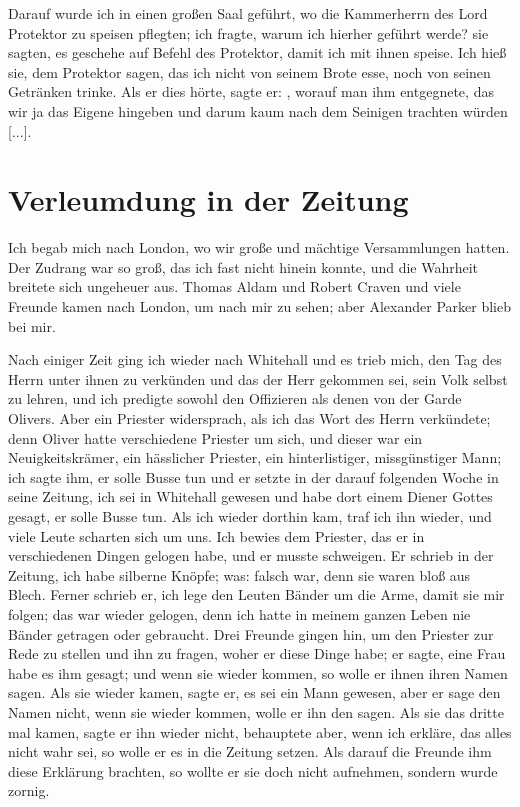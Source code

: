 Darauf wurde ich in einen großen Saal geführt, wo
die Kammerherrn des Lord Protektor zu speisen pflegten; ich fragte,
warum ich hierher geführt werde? sie sagten, es geschehe auf
Befehl des Protektor, damit ich mit ihnen speise. Ich hieß sie,
dem Protektor sagen, das ich nicht von seinem Brote esse, noch
von seinen Getränken trinke. 
Als er dies hörte, sagte er: , worauf man 
ihm entgegnete, das wir
ja das Eigene hingeben und darum kaum nach dem Seinigen
trachten würden [...].

\section{Verleumdung in der Zeitung}

Ich begab mich nach London, wo wir große und mächtige
Versammlungen hatten. Der Zudrang war so groß, das ich fast
nicht hinein konnte, 
und die Wahrheit breitete sich ungeheuer aus.
Thomas Aldam und Robert 
Craven und viele Freunde kamen
nach London, um nach mir zu sehen; aber 
Alexander Parker blieb bei mir.

Nach einiger Zeit ging ich wieder nach Whitehall und es
trieb mich, den Tag des Herrn unter ihnen zu verkünden und
das der Herr gekommen sei, sein Volk selbst zu lehren, und ich
predigte sowohl den Offizieren 
als denen von der Garde Olivers.
Aber ein Priester widersprach, als ich das Wort des Herrn
verkündete; denn Oliver hatte verschiedene Priester um sich, und
dieser war ein Neuigkeitskrämer, ein hässlicher Priester, ein 
hinterlistiger, missgünstiger Mann; ich sagte ihm, er solle Busse tun
und er setzte in der darauf folgenden Woche in seine Zeitung,
ich sei in Whitehall gewesen und habe dort einem Diener Gottes
gesagt, er solle Busse tun. Als ich wieder dorthin kam, traf ich
ihn wieder, und viele Leute scharten sich um uns. Ich bewies
dem Priester, das er in verschiedenen Dingen gelogen habe, und
er musste schweigen. Er schrieb in der 
Zeitung, ich habe silberne
Knöpfe; was: falsch war, denn sie waren bloß aus Blech. Ferner
schrieb er, ich lege den Leuten Bänder um die Arme, damit sie
mir folgen; das war wieder gelogen, denn ich hatte in meinem
ganzen Leben nie Bänder getragen oder gebraucht. Drei Freunde
gingen hin, um den Priester zur Rede zu stellen und ihn zu
fragen, woher er diese Dinge habe; er sagte, eine Frau habe es
ihm gesagt; und wenn sie wieder kommen, so wolle er ihnen ihren
Namen sagen. Als sie wieder kamen, sagte er, es sei ein Mann
gewesen, aber er sage den Namen nicht, wenn sie wieder kommen,
wolle er ihn den sagen. Als sie das dritte mal kamen, sagte
er ihn wieder nicht, behauptete aber, wenn ich erkläre, das alles
nicht wahr sei, so wolle er es in die Zeitung setzen. Als darauf
die Freunde ihm diese Erklärung brachten, so wollte er sie doch
nicht aufnehmen, sondern wurde zornig. 

